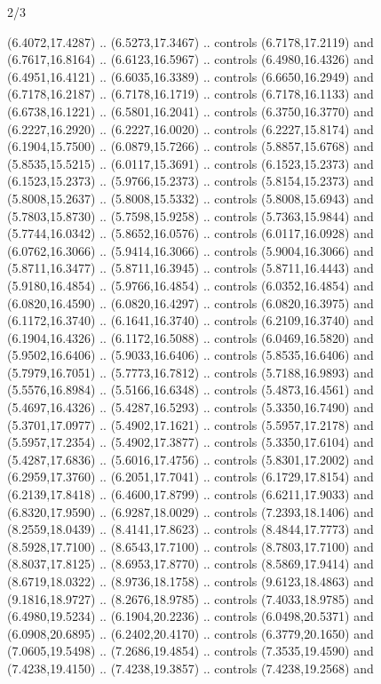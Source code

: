 \begin{flagdescription}{2/3}
\begin{scope}[yshift=\flagwidth,scale=\flagwidth/1241.93737]
\begin{scope}[y=-1mm, x=1mm,draw=gold,fill=blue,line join=miter,miter limit=4,line width=1.8\lw]
{  (6.4072,17.4287) .. (6.5273,17.3467) .. controls (6.7178,17.2119) and
  (6.7617,16.8164) .. (6.6123,16.5967) .. controls (6.4980,16.4326) and
  (6.4951,16.4121) .. (6.6035,16.3389) .. controls (6.6650,16.2949) and
  (6.7178,16.2187) .. (6.7178,16.1719) .. controls (6.7178,16.1133) and
  (6.6738,16.1221) .. (6.5801,16.2041) .. controls (6.3750,16.3770) and
  (6.2227,16.2920) .. (6.2227,16.0020) .. controls (6.2227,15.8174) and
  (6.1904,15.7500) .. (6.0879,15.7266) .. controls (5.8857,15.6768) and
  (5.8535,15.5215) .. (6.0117,15.3691) .. controls (6.1523,15.2373) and
  (6.1523,15.2373) .. (5.9766,15.2373) .. controls (5.8154,15.2373) and
  (5.8008,15.2637) .. (5.8008,15.5332) .. controls (5.8008,15.6943) and
  (5.7803,15.8730) .. (5.7598,15.9258) .. controls (5.7363,15.9844) and
  (5.7744,16.0342) .. (5.8652,16.0576) .. controls (6.0117,16.0928) and
  (6.0762,16.3066) .. (5.9414,16.3066) .. controls (5.9004,16.3066) and
  (5.8711,16.3477) .. (5.8711,16.3945) .. controls (5.8711,16.4443) and
  (5.9180,16.4854) .. (5.9766,16.4854) .. controls (6.0352,16.4854) and
  (6.0820,16.4590) .. (6.0820,16.4297) .. controls (6.0820,16.3975) and
  (6.1172,16.3740) .. (6.1641,16.3740) .. controls (6.2109,16.3740) and
  (6.1904,16.4326) .. (6.1172,16.5088) .. controls (6.0469,16.5820) and
  (5.9502,16.6406) .. (5.9033,16.6406) .. controls (5.8535,16.6406) and
  (5.7979,16.7051) .. (5.7773,16.7812) .. controls (5.7188,16.9893) and
  (5.5576,16.8984) .. (5.5166,16.6348) .. controls (5.4873,16.4561) and
  (5.4697,16.4326) .. (5.4287,16.5293) .. controls (5.3350,16.7490) and
  (5.3701,17.0977) .. (5.4902,17.1621) .. controls (5.5957,17.2178) and
  (5.5957,17.2354) .. (5.4902,17.3877) .. controls (5.3350,17.6104) and
  (5.4287,17.6836) .. (5.6016,17.4756) .. controls (5.8301,17.2002) and
  (6.2959,17.3760) .. (6.2051,17.7041) .. controls (6.1729,17.8154) and
  (6.2139,17.8418) .. (6.4600,17.8799) .. controls (6.6211,17.9033) and
  (6.8320,17.9590) .. (6.9287,18.0029) .. controls (7.2393,18.1406) and
  (8.2559,18.0439) .. (8.4141,17.8623) .. controls (8.4844,17.7773) and
  (8.5928,17.7100) .. (8.6543,17.7100) .. controls (8.7803,17.7100) and
  (8.8037,17.8125) .. (8.6953,17.8770) .. controls (8.5869,17.9414) and
  (8.6719,18.0322) .. (8.9736,18.1758) .. controls (9.6123,18.4863) and
  (9.1816,18.9727) .. (8.2676,18.9785) .. controls (7.4033,18.9785) and
  (6.4980,19.5234) .. (6.1904,20.2236) .. controls (6.0498,20.5371) and
  (6.0908,20.6895) .. (6.2402,20.4170) .. controls (6.3779,20.1650) and
  (7.0605,19.5498) .. (7.2686,19.4854) .. controls (7.3535,19.4590) and
  (7.4238,19.4150) .. (7.4238,19.3857) .. controls (7.4238,19.2568) and
}
\end{scope}
\end{scope}
\end{flagdescription}
